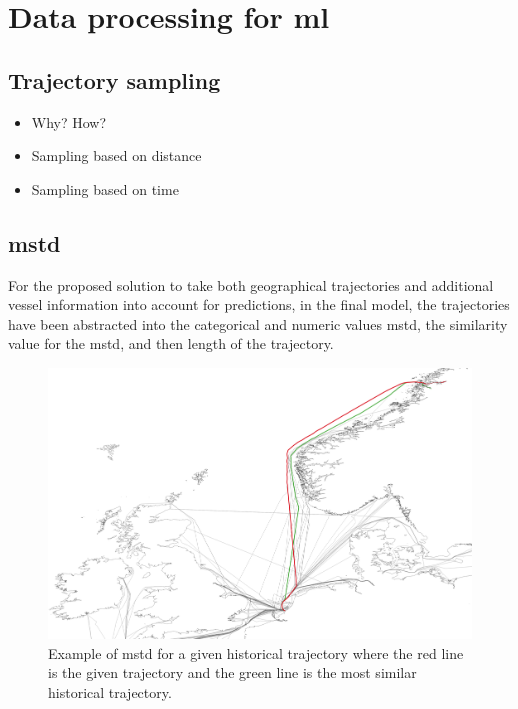 \section{Data processing for \acrfull{ml}}

\subsection{Trajectory sampling}

\begin{itemize}
    \item Why? How?
    \item Sampling based on distance
    \item Sampling based on time
\end{itemize}

\subsection{\acrfull{mstd}}

For the proposed solution to take both geographical trajectories and additional vessel information into account for predictions, in the final model, the trajectories have been abstracted into the categorical and numeric values \acrshort{mstd}, the similarity value for the \acrshort{mstd}, and then length of the trajectory.

\begin{figure}[htbp]  %
    \centering
    \includegraphics[width=1.0\textwidth]{figures/mstd}
    \caption{Example of \acrshort{mstd} for a given historical trajectory where the red line is the given trajectory and the green line is the most similar historical trajectory.}
    \label{fig:mstd}
\end{figure}


